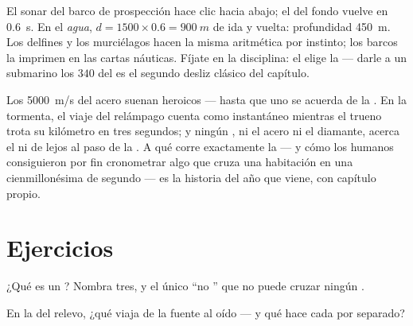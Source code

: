 \begin{example}\label{ex:g7:sound-production:sonar}
El sonar del barco de prospección hace clic hacia abajo; el
 del fondo vuelve en \qty{0.6}{s}. En el \emph{agua}, $d = 1500
\times 0.6 = \qty{900}{m}$ de ida y vuelta: profundidad \qty{450}{m}.
Los delfines y los murciélagos hacen la misma aritmética por instinto;
los barcos la imprimen en las cartas náuticas. Fíjate en la
disciplina: el  elige la  --- darle a un
 submarino los $340$ del  es el segundo desliz clásico
del capítulo.
\end{example}

\begin{remark}\label{rem:g7:sound-production:light}
Los \qty{5000}{m/s} del acero suenan heroicos --- hasta que uno se
acuerda de la . En la tormenta, el viaje del relámpago cuenta como
instantáneo mientras el trueno trota su kilómetro en tres segundos; y
ningún , ni el acero ni el diamante, acerca el  ni
de lejos al paso de la . A qué  corre exactamente la
 --- y cómo los humanos consiguieron por fin cronometrar algo que
cruza una habitación en una cienmillonésima de segundo --- es la
historia del año que viene, con capítulo propio.
\end{remark}

\section{Ejercicios}

\begin{exercise}[$\star$]\label{exo:g7:sound-production:1}
¿Qué es un ? Nombra tres, y el único ``no '' que
no puede cruzar ningún .
\end{exercise}

\begin{exercise}[$\star$]\label{exo:g7:sound-production:2}
En la  del relevo, ¿qué viaja de la fuente al oído --- y qué
hace cada  por separado?
\end{exercise}

